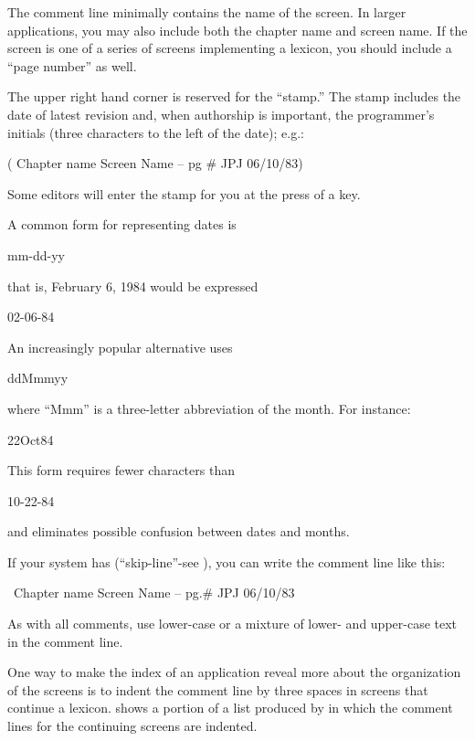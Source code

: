 The comment line minimally contains the name of the screen.  In larger
applications, you may also include both the chapter name and screen
name.  If the screen is one of a series of screens implementing a
lexicon, you should include a ``page number'' as well.

%
The upper right hand corner is reserved for the ``stamp.'' The stamp
includes the date of latest revision and, when authorship is
important, the programmer's initials (three characters to the left of
the date); e.g.:
\begin{Code}
( Chapter name        Screen Name -- pg #      JPJ 06/10/83)
\end{Code}
Some \Forth{} editors will enter the stamp for you at the press of a key.

A common form for representing dates is
\begin{Code}
mm-dd-yy
\end{Code}
that is, February 6, 1984 would be expressed
\begin{Code}
02-06-84
\end{Code}
An increasingly popular alternative uses
\begin{Code}
ddMmmyy
\end{Code}
where ``Mmm'' is a three-letter abbreviation of the month.  For instance:
\begin{Code}
22Oct84
\end{Code}
This form requires fewer characters than
\begin{Code}
10-22-84
\end{Code}
and eliminates possible confusion between dates and months.%
%

If your system has \forth{\bs} (``skip-line''-see ), you can
write the comment line like this:
\begin{Code}
\ Chapter name        Screen Name -- pg.#       JPJ 06/10/83
\end{Code}
As with all comments, use lower-case or a mixture of lower- and
upper-case text in the comment line.

One way to make the index of an application reveal more about the
organization of the screens is to indent the comment line by three
spaces in screens that continue a lexicon.   shows a
portion of a list produced by  in which the comment lines
for the continuing screens are indented.%

